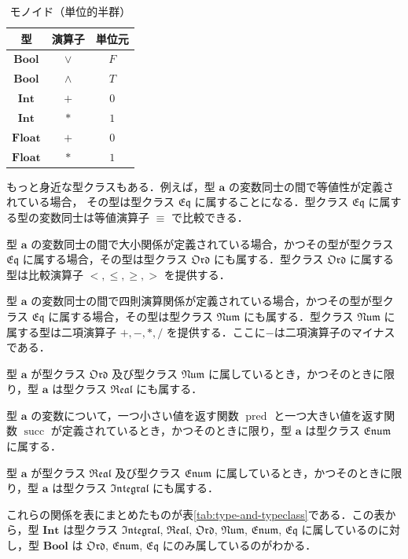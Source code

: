 \documentclass[a4paper]{jsbook}
\newcommand{\mType}[1]{\mathbf{#1}}
\newcommand{\mBoolType}{\mType{Bool}}
\newcommand{\mIntType}{\mType{Int}}
\newcommand{\mFloatType}{\mType{Float}}
\newcommand{\mSpecialTypeClass}[1]{\mathfrak{#1}} %
\newcommand{\mEqTypeClass}{\mSpecialTypeClass{Eq}}
\newcommand{\mOrdTypeClass}{\mSpecialTypeClass{Ord}}
\newcommand{\mNumTypeClass}{\mSpecialTypeClass{Num}}
\newcommand{\mRealTypeClass}{\mSpecialTypeClass{Real}}
\newcommand{\mEnumTypeClass}{\mSpecialTypeClass{Enum}}
\newcommand{\mIntegralTypeClass}{\mSpecialTypeClass{Integral}}
\DeclareMathOperator{\mPred}{pred}
\DeclareMathOperator{\mSucc}{succ}
\begin{document}
\begin{table}
\caption{モノイド（単位的半群）}
\label{tab:monoids}
\begin{center}
\begin{tabular}{||c||c|c||}
\hline
型
    &演算子
    &単位元\\
\hline\hline
$\mBoolType$
    &$\vee$
    &$F$\\
\hline
$\mBoolType$
    &$\wedge$
    &$T$\\
\hline
$\mIntType$
    &$+$
    &$0$\\
\hline
$\mIntType$
    &$*$
    &$1$\\
\hline
$\mFloatType$
    &$+$
    &$0$\\
\hline
$\mFloatType$
    &$*$
    &$1$\\
\hline
\end{tabular}
\end{center}
\end{table}


もっと身近な型クラスもある．例えば，型 $\mType{a}$ の変数同士の間で等値性が定義されている場合，
その型は型クラス $\mEqTypeClass$ に属することになる．型クラス $\mEqTypeClass$ に属する型の変数同士は等値演算子 $\equiv$ で比較できる．

型 $\mType{a}$ の変数同士の間で大小関係が定義されている場合，かつその型が型クラス $\mEqTypeClass$ に属する場合，その型は型クラス $\mOrdTypeClass$ にも属する．型クラス $\mOrdTypeClass$ に属する型は比較演算子 $<,\le,\ge,>$ を提供する．

型 $\mType{a}$ の変数同士の間で四則演算関係が定義されている場合，かつその型が型クラス $\mEqTypeClass$ に属する場合，その型は型クラス $\mNumTypeClass$ にも属する．型クラス $\mNumTypeClass$ に属する型は二項演算子 $+,-,*,/$ を提供する．ここに$-$は二項演算子のマイナスである．

型 $\mType{a}$ が型クラス $\mOrdTypeClass$ 及び型クラス $\mNumTypeClass$ に属しているとき，かつそのときに限り，型 $\mType{a}$ は型クラス $\mRealTypeClass$ にも属する．

型 $\mType{a}$ の変数について，一つ小さい値を返す関数 $\mPred$ と一つ大きい値を返す関数 $\mSucc$ が定義されているとき，かつそのときに限り，型 $\mType{a}$ は型クラス $\mEnumTypeClass$ に属する．

型 $\mType{a}$ が型クラス $\mRealTypeClass$ 及び型クラス $\mEnumTypeClass$ に属しているとき，かつそのときに限り，型 $\mType{a}$ は型クラス $\mIntegralTypeClass$ にも属する．

これらの関係を表にまとめたものが表\ref{tab:type-and-typeclass}である．この表から，型 $\mIntType$ は型クラス $\mIntegralTypeClass$, $\mRealTypeClass$, $\mOrdTypeClass$, $\mNumTypeClass$, $\mEnumTypeClass$, $\mEqTypeClass$ に属しているのに対し，型 $\mBoolType$ は $\mOrdTypeClass$, $\mEnumTypeClass$, $\mEqTypeClass$ にのみ属しているのがわかる．
\end{document}
